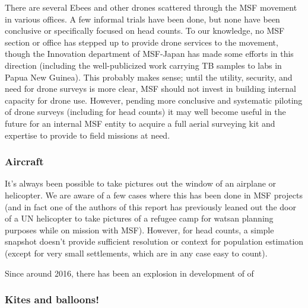\documentclass[a4paper,12pt,twoside]{article}
\begin{document}
There are several Ebees and other drones scattered through the MSF movement in various offices. A few informal trials have been done, but none have been conclusive or specifically focused on head counts. To our knowledge, no MSF section or office has stepped up to provide drone services to the movement, though the Innovation department of MSF-Japan has made some efforts in this direction (including the well-publicized work carrying TB samples to labs in Papua New Guinea). This probably makes sense; until the utility, security, and need for drone surveys is more clear, MSF should not invest in building internal capacity for drone use. However, pending more conclusive and systematic piloting of drone surveys (including for head counts) it may well become useful in the future for an internal MSF entity to acquire a full aerial surveying kit and expertise to provide to field missions at need. 

\subsubsection{Aircraft}
It's always been possible to take pictures out the window of an airplane or helicopter. We are aware of a few cases where this has been done in MSF projects (and in fact one of the authors of this report has previously leaned out the door of a UN helicopter to take pictures of a refugee camp for watsan planning purposes while on mission with MSF). However, for head counts, a simple snapshot doesn't provide sufficient resolution or context for population estimation (except for very small settlements, which are in any case easy to count).  

Since around 2016, there has been an explosion in development of of

\subsubsection{Kites and balloons!}
\end{document}
